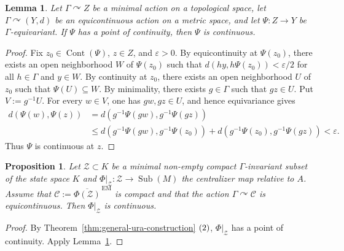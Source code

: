 \documentclass[12pt]{amsart} %
\theoremstyle{plain}
\newtheorem{lemma}[theorem]{Lemma}
\newtheorem{proposition}[theorem]{Proposition}
\theoremstyle{definition}
\DeclareMathOperator{\Sub}{Sub}
\begin{document}
\begin{lemma}
\label{lem:minimal-equicontinuous-propagation}
Let $\Gamma\curvearrowright Z$ be a minimal action on a topological space,
let $\Gamma\curvearrowright(Y,d)$ be an equicontinuous action on a metric
space, and let $\Psi:Z\to Y$ be $\Gamma$-equivariant. If $\Psi$ has a point
of continuity, then $\Psi$ is continuous.
\end{lemma}
\begin{proof}
Fix $z_0\in\operatorname{Cont}(\Psi)$, $z\in Z$, and $\varepsilon>0$.
By equicontinuity at $\Psi(z_0)$, there exists an open neighborhood $W$ of
$\Psi(z_0)$ such that $d(hy,h\Psi(z_0))<\varepsilon/2$ for all $h\in\Gamma$ and $y\in W$. By continuity at $z_0$, there exists an
open neighborhood $U$ of $z_0$ such that $\Psi(U)\subseteq W$.
By minimality, there exists $g\in\Gamma$ such that $gz\in U$. Put
$V:=g^{-1}U$. For every $w\in V$, one has $gw,gz\in U$, and hence
equivariance gives
$$
\begin{aligned}
d(\Psi(w),\Psi(z))
&=d(g^{-1}\Psi(gw),g^{-1}\Psi(gz))\\
&\leq d(g^{-1}\Psi(gw),g^{-1}\Psi(z_0))
+d(g^{-1}\Psi(z_0),g^{-1}\Psi(gz))<\varepsilon.
\end{aligned}
$$
Thus $\Psi$ is continuous at $z$.
\end{proof}
\begin{proposition}
\label{prop:equicontinuous-centralizer-continuity}
Let $\mathcal Z\subset K$ be a minimal non-empty compact
$\Gamma$-invariant subset of the state space $K$ and $
\Phi\vert_{\mathcal{Z}}:\mathcal Z\to\Sub(M)$ the centralizer map relative to $A$. Assume that
$\mathcal C:=\overline{\Phi(\mathcal Z)}^{\,\mathrm{EM}}$
is compact and that the action $\Gamma\curvearrowright\mathcal C$ is
equicontinuous. Then $\Phi\vert_{\mathcal{Z}}$ is continuous.
\end{proposition}
\begin{proof}
By Theorem~\ref{thm:general-ura-construction} $\rm(2)$,
$\Phi|_{\mathcal Z}$ has a point of continuity. Apply
Lemma~\ref{lem:minimal-equicontinuous-propagation}.
\end{proof}
\end{document}
